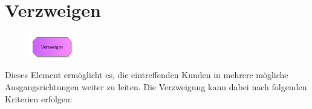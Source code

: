 \section{Verzweigen}
\label{ref:ModelElementDecide}

\begin{figure}
\vspace{-22pt}
\includegraphics[width=2cm]{imageModelElementDecide.png}
\vspace{-22pt}
\end{figure}

Dieses Element ermöglicht es, die eintreffenden Kunden in mehrere mögliche Ausgangsrichtungen weiter zu leiten.
Die Verzweigung kann dabei nach folgenden Kriterien erfolgen:


